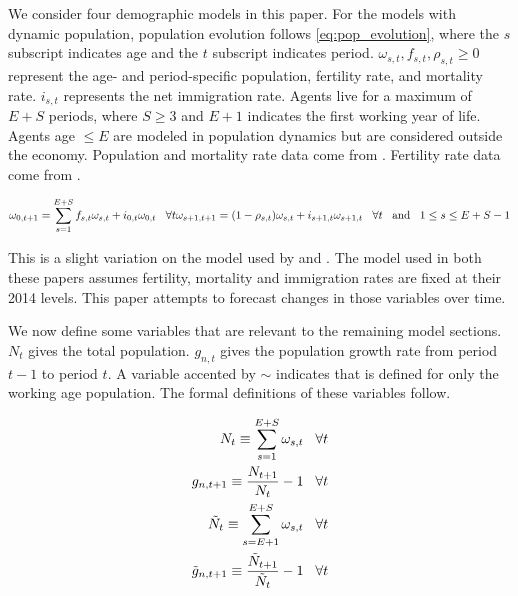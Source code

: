 \documentclass[10pt]{article}
\renewcommand{\thesection}{\arabic{section}}
\renewcommand{\thesubsection}{\thesection.\arabic{subsection}}
\renewcommand{\thesubsubsection}{\thesubsection.\arabic{subsubsection}}
\renewcommand{\subsubsection}[2][]{\oldsubsubsection[#1]{#2}\index{#1}\label{sec:\thesubsubsection}}
\numberwithin{equation}{subsection}
\begin{document}
\begin{appendices}
\subsubsection{Demographics}

\par We consider four demographic models in this paper. For the models with dynamic population, population evolution follows \ref{eq:pop_evolution}, where the \(s\) subscript indicates age and the \(t\) subscript indicates period. \(\omega_{s,t}, f_{s,t}, \rho_{s,t} \geq 0\) represent the age- and period-specific population, fertility rate, and mortality rate. \(i_{s,t}\) represents the net immigration rate. Agents live for a maximum of \(E+S\) periods, where \(S \geq 3\) and \(E + 1\) indicates the first working year of life. Agents age \(\leq E\) are modeled in population dynamics but are considered outside the economy. Population and mortality rate data come from \cite{JMD2018}. Fertility rate data come from \cite{HFC2018}.

\begin{dmath}\label{eq:pop_evolution}
   {\omega_{0,t+1} = \sum_{s=1}^{E+S}f_{s,t}\omega_{s,t} + i_{0,t}\omega_{0,t} \hspace{3mm} \forall t} \\
   {\omega_{s+1,t+1} = (1 - \rho_{s,t})\omega_{s,t} + i_{s+1,t}\omega_{s+1,t} \hspace{3mm} \forall t \hspace{3mm} \text{and} \hspace{3mm} 1 \leq s \leq E + S - 1}
\end{dmath}

\par This is a slight variation on the model used by \cite{DE2018} and \citet{IO2019}. The model used in both these papers assumes fertility, mortality and immigration rates are fixed at their 2014 levels. This paper attempts to forecast changes in those variables over time.

\par We now define some variables that are relevant to the remaining model sections. \(N_t\) gives the total population. \(g_{n,t}\) gives the population growth rate from period \(t-1\) to period \(t\). A variable accented by \(\sim\) indicates that is defined for only the working age population. The formal definitions of these variables follow.

\begin{align}
   N_t \equiv \sum_{s=1}^{E+S}\omega_{s,t} \hspace{3mm} \forall t \\
   g_{n,t+1} \equiv \frac{N_{t+1}}{N_t} - 1 \hspace{3mm} \forall t \\
   \tilde{N}_t \equiv \sum_{s=E+1}^{E+S}\omega_{s,t} \hspace{3mm} \forall t \\
   \tilde{g}_{n,t+1} \equiv \frac{\tilde{N}_{t+1}}{\tilde{N}_t} - 1 \hspace{3mm} \forall t
\end{align}


\end{appendices}
\end{document}
